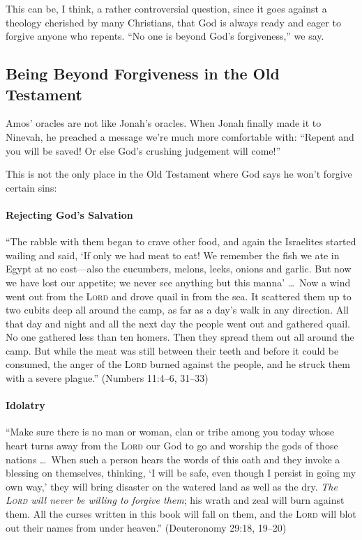 This can be, I think, a rather controversial question, since it goes against a
theology cherished by many Christians, that God is always ready and eager to
forgive anyone who repents. \enquote{No one is beyond God's forgiveness,} we
say.

\subsection{Being Beyond Forgiveness in the Old Testament}

Amos' oracles are not like Jonah's oracles. When Jonah finally made it to
Ninevah, he preached a message we're much more comfortable with:
\enquote{Repent and you will be saved! Or else God's crushing judgement will
come!}

This is not the only place in the Old Testament where God says he won't forgive
certain sins:

\paragraph{Rejecting God's Salvation}\enquote{The rabble with them began to
crave other food, and again the Israelites started wailing and said, \enquote{If
only we had meat to eat! We remember the fish we ate in Egypt at no cost---also
the cucumbers, melons, leeks, onions and garlic. But now we have lost our
appetite; we never see anything but this manna} \dots\ Now a wind went out from
the \textsc{Lord} and drove quail in from the sea. It scattered them up to two
cubits deep all around the camp, as far as a day's walk in any direction. All
that day and night and all the next day the people went out and gathered quail.
No one gathered less than ten homers. Then they spread them out all around the
camp. But while the meat was still between their teeth and before it could be
consumed, the anger of the \textsc{Lord} burned against the people, and he
struck them with a severe plague.} (Numbers 11:4--6, 31--33)

\paragraph{Idolatry}\enquote{Make sure there is no man or woman, clan or tribe
among you today whose heart turns away from the \textsc{Lord} our God to go and
worship the gods of those nations \dots\ When such a person hears the words of
this oath and they invoke a blessing on themselves, thinking, \enquote{I will be
safe, even though I persist in going my own way,} they will bring disaster on
the watered land as well as the dry. \emph{The \textsc{Lord} will never be
willing to forgive them}; his wrath and zeal will burn against them. All the
curses written in this book will fall on them, and the \textsc{Lord} will blot
out their names from under heaven.} (Deuteronomy 29:18, 19--20)

